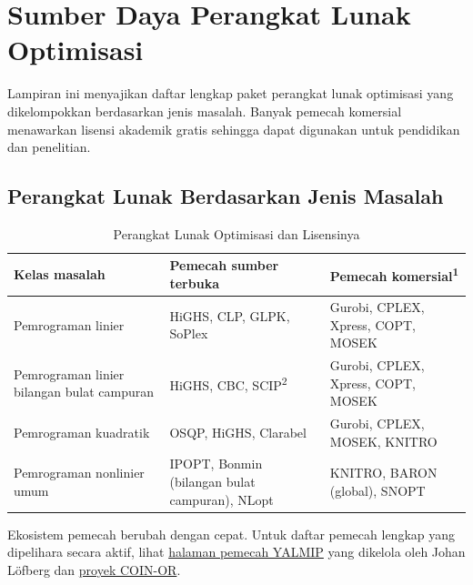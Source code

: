 
\chapter{Sumber Daya Perangkat Lunak Optimisasi}
\label{app:software}

Lampiran ini menyajikan daftar lengkap paket perangkat lunak optimisasi yang dikelompokkan berdasarkan jenis masalah. Banyak pemecah komersial menawarkan lisensi akademik gratis sehingga dapat digunakan untuk pendidikan dan penelitian.

\section{Perangkat Lunak Berdasarkan Jenis Masalah}

\begin{table}[H]
\centering
\small
\begin{tabular}{p{3.2cm}p{5.4cm}p{4.6cm}}
\hline
\textbf{Kelas masalah} & \textbf{Pemecah sumber terbuka} & \textbf{Pemecah komersial}\textsuperscript{1} \\ \hline
Pemrograman linier & HiGHS, CLP, GLPK, SoPlex & Gurobi, CPLEX, Xpress, COPT, MOSEK \\[0.4em]
Pemrograman linier bilangan bulat campuran & HiGHS, CBC, SCIP\textsuperscript{2} & Gurobi, CPLEX, Xpress, COPT, MOSEK \\[0.4em]
Pemrograman kuadratik & OSQP, HiGHS, Clarabel & Gurobi, CPLEX, MOSEK, KNITRO \\[0.4em]
Pemrograman nonlinier umum & IPOPT, Bonmin (bilangan bulat campuran), NLopt & KNITRO, BARON (global), SNOPT \\ \hline
\end{tabular}
\caption{Perangkat Lunak Optimisasi dan Lisensinya}
\label{tab:optimization_software_appendix}
\end{table}

Ekosistem pemecah berubah dengan cepat. Untuk daftar pemecah lengkap yang dipelihara secara aktif, lihat \href{https://yalmip.github.io/allsolvers/}{halaman pemecah YALMIP} yang dikelola oleh Johan L\"ofberg dan \href{https://www.coin-or.org/}{proyek COIN-OR}.


